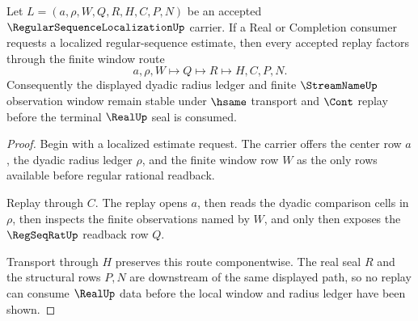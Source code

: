 \begin{theorem}
\label{thm:regular-sequence-localization-window-stability}
Let $L=(a,\rho,W,Q,R,H,C,P,N)$ be an accepted $\RegularSequenceLocalizationUp$ carrier. If a Real or Completion consumer requests a localized regular-sequence estimate, then every accepted replay factors through the finite window route
$$
a,\rho,W \longmapsto Q \longmapsto R \longmapsto H,C,P,N .
$$
Consequently the displayed dyadic radius ledger and finite $\StreamNameUp$ observation window remain stable under $\hsame$ transport and $\Cont$ replay before the terminal $\RealUp$ seal is consumed.
\end{theorem}
\begin{proof}
Begin with a localized estimate request. The carrier offers the center row $a$, the dyadic radius ledger $\rho$, and the finite window row $W$ as the only rows available before regular rational readback.

Replay through $C$. The replay opens $a$, then reads the dyadic comparison cells in $\rho$, then inspects the finite observations named by $W$, and only then exposes the $\RegSeqRatUp$ readback row $Q$.

Transport through $H$ preserves this route componentwise. The real seal $R$ and the structural rows $P,N$ are downstream of the same displayed path, so no replay can consume $\RealUp$ data before the local window and radius ledger have been shown.
\end{proof}




